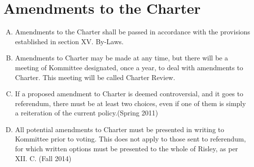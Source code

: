 \documentclass[12pt]{article}
\begin{document}
\section{Amendments to the Charter}
\begin{enumerate}[A.]
\item Amendments to the Charter shall be passed in accordance with the provisions established in section XV. By-Laws.
\item Amendments to Charter may be made at any time, but there will be a meeting of Kommittee designated, once a year, to deal with amendments to Charter. This meeting will be called Charter Review.
\item If a proposed amendment to Charter is deemed controversial, and it goes to referendum, there must be at least two choices, even if one of them is simply a reiteration of the current policy.(Spring 2011)
\item All potential amendments to Charter must be presented in writing to Kommittee prior to voting.  This does not apply to those sent to referendum, for which written options must be presented to the whole of Risley, as per XII. C. (Fall 2014)
\end{enumerate}
\end{document}
